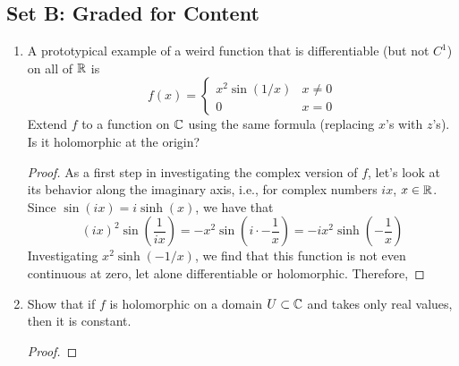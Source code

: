 \documentclass[../psets.tex]{subfiles}
\begin{document}
\subsection*{Set B: Graded for Content}
\begin{enumerate}[label={\textbf{\arabic*.}}]
    \item A prototypical example of a weird function that is differentiable (but not $C^1$) on all of $\mathbb{R}$ is
    \begin{equation*}
        f(x) =
        \begin{cases}
            x^2\sin(1/x) & x\neq 0\\
            0 & x=0
        \end{cases}
    \end{equation*}
    Extend $f$ to a function on $\mathbb{C}$ using the same formula (replacing $x$'s with $z$'s). Is it holomorphic at the origin?
    \begin{proof}



        As a first step in investigating the complex version of $f$, let's look at its behavior along the imaginary axis, i.e., for complex numbers $ix$, $x\in\mathbb{R}$. Since $\sin(ix)=i\sinh(x)$, we have that
        \begin{equation*}
            (ix)^2\sin(\frac{1}{ix}) = -x^2\sin(i\cdot -\frac{1}{x})
            = -ix^2\sinh(-\frac{1}{x})
        \end{equation*}
        Investigating $x^2\sinh(-1/x)$, we find that this function is not even continuous at zero, let alone differentiable or holomorphic. Therefore, 
    \end{proof}
    \item Show that if $f$ is holomorphic on a domain $U\subset\mathbb{C}$ and takes only real values, then it is constant.
    \begin{proof}


\end{proof}
\end{enumerate}
\end{document}
